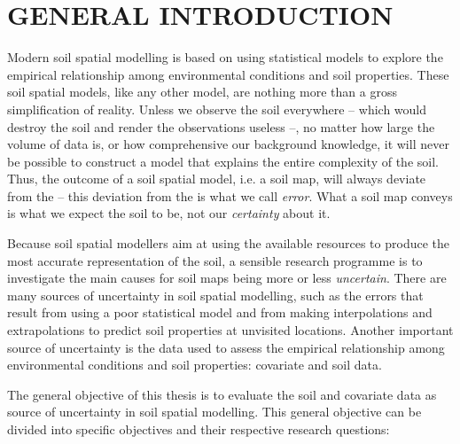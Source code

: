 \setcounter{page}{1}
\artigofalse
\chapter{GENERAL INTRODUCTION}
\label{chap:introduction}

Modern soil spatial modelling is based on using statistical models to explore the empirical relationship among 
environmental conditions and soil properties. These soil spatial models, like any other model, are nothing 
more than a gross simplification of reality. Unless we observe the soil everywhere -- which would destroy the 
soil and render the observations useless --, no matter how large the volume of data is, or how comprehensive 
our background knowledge, it will never be possible to construct a model that explains the entire complexity 
of the soil. Thus, the outcome of a soil spatial model, i.e. a soil map, will always deviate from the 
 -- this deviation from the  is what we call \emph{error}. What a soil map conveys is what 
we expect the soil to be, not our \emph{certainty} about it.

Because soil spatial modellers aim at using the available resources to produce the most accurate 
representation of the soil, a sensible research programme is to investigate the main causes for soil maps 
being more or less \emph{uncertain}. There are many sources of uncertainty in soil spatial modelling, such as 
the errors that result from using a poor statistical model and from making interpolations and extrapolations 
to predict soil properties at unvisited locations. Another important source of uncertainty is the data used to 
assess the empirical relationship among environmental conditions and soil properties: covariate and soil data.

The general objective of this thesis is to evaluate the soil and covariate data as source of uncertainty in 
soil spatial modelling. This general objective can be divided into specific objectives and their respective 
research questions:


